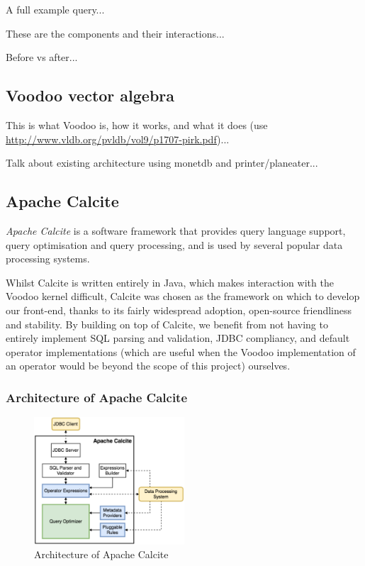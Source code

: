 A full example query...

These are the components and their interactions...

Before vs after...

\subsection{Voodoo vector algebra}

This is what Voodoo is, how it works, and what it does (use \url{http://www.vldb.org/pvldb/vol9/p1707-pirk.pdf})...

Talk about existing architecture using monetdb and printer/planeater...

\subsection{Apache Calcite}

\emph{Apache Calcite} \cite{Begoli:2018:ACF:3183713.3190662} is a software framework that provides query language support, query optimisation and query processing, and is used by several popular data processing systems.

Whilst Calcite is written entirely in Java, which makes interaction with the Voodoo kernel difficult, Calcite was chosen as the framework on which to develop our front-end, thanks to its fairly widespread adoption, open-source friendliness and stability. By building on top of Calcite, we benefit from not having to entirely implement SQL parsing and validation, JDBC compliancy, and default operator implementations (which are useful when the Voodoo implementation of an operator would be beyond the scope of this project) ourselves.

\subsubsection{Architecture of Apache Calcite}

\begin{figure}
\includegraphics[width=0.5\textwidth]{design-and-implementation/calcite-architecture.png}
\centering
\caption{Architecture of Apache Calcite \cite{Begoli:2018:ACF:3183713.3190662}}
\label{fig:calcite-architecture}
\end{figure}

